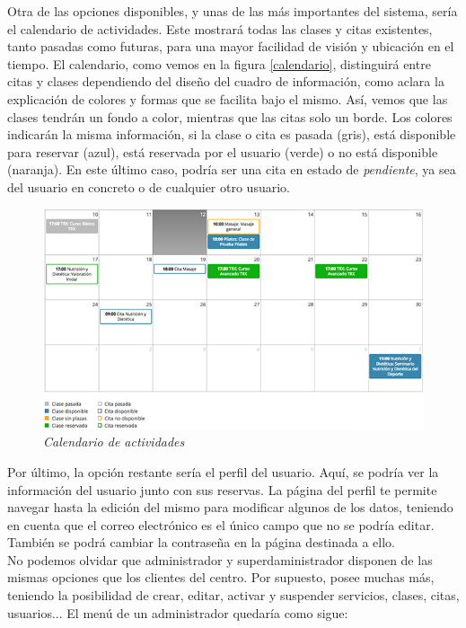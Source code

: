 Otra de las opciones disponibles, y unas de las más importantes del sistema, sería el calendario de actividades. Este mostrará todas las clases y citas existentes, tanto pasadas como futuras, para una mayor facilidad de visión y ubicación en el tiempo. El calendario, como vemos en la figura \ref{calendario}, distinguirá entre citas y clases dependiendo del diseño del cuadro de información, como aclara la explicación de colores y formas que se facilita bajo el mismo. Así, vemos que las clases tendrán un fondo a color, mientras que las citas solo un borde. Los colores indicarán la misma información, si la clase o cita es pasada (gris), está disponible para reservar (azul), está reservada por el usuario (verde) o no está disponible (naranja). En este último caso, podría ser una cita en estado de \textit{pendiente}, ya sea del usuario en concreto o de cualquier otro usuario. 

\begin{figure}
\centering
  \includegraphics[scale=.60]{img/manual/calendario.jpg}
  \caption{\textit{Calendario de actividades}}
  \label{fig:calendario}
\end{figure}

Por último, la opción restante sería el perfil del usuario. Aquí, se podría ver la información del usuario junto con sus reservas. La página del perfil te permite navegar hasta la edición del mismo para modificar algunos de los datos, teniendo en cuenta que el correo electrónico es el único campo que no se podría editar. También se podrá cambiar la contraseña en la página destinada a ello.\\

No podemos olvidar que administrador y superdaministrador disponen de las mismas opciones que los clientes del centro. Por supuesto, posee muchas más, teniendo la posibilidad de crear, editar, activar y suspender servicios, clases, citas, usuarios... El menú de un administrador quedaría como sigue:

